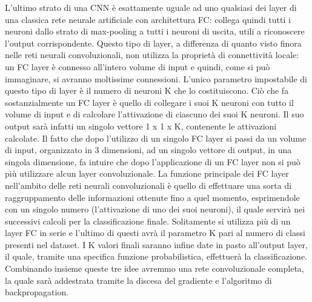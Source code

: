 \documentclass[twoside,twocolumn,10pt]{extarticle}
\theoremstyle{definition}
\begin{document}
L'ultimo strato di una CNN è esattamente uguale ad uno qualsiasi dei layer di una classica rete neurale artificiale con architettura FC: collega quindi tutti i neuroni dallo strato di max-pooling a tutti i neuroni di uscita, utili a riconoscere l'output corrispondente.
Questo tipo di layer, a differenza di quanto visto finora nelle reti neurali convoluzionali, non utilizza la proprietà di connettività locale: un FC layer è connesso all'intero volume di input e quindi, come si può immaginare, si avranno moltissime connessioni. L’unico parametro impostabile di questo tipo di layer è il numero di neuroni K che lo costituiscono. Ciò che fa sostanzialmente un FC layer è quello di collegare i suoi K neuroni con tutto il volume di input e di calcolare l’attivazione di ciascuno dei suoi K neuroni.
Il suo output sarà infatti un singolo vettore 1 x 1 x K, contenente le attivazioni calcolate. Il fatto che dopo l’utilizzo di un singolo FC layer si passi da un volume di input, organizzato in 3 dimensioni, ad un singolo vettore di output, in una singola dimensione, fa intuire che dopo l’applicazione di un FC layer non si può più utilizzare alcun layer convoluzionale. La funzione principale dei FC layer nell'ambito delle reti neurali convoluzionali è quello di effettuare una sorta di raggruppamento delle informazioni ottenute fino
a quel momento, esprimendole con un singolo numero (l’attivazione di uno dei suoi neuroni), il quale servirà nei successivi calcoli per la classificazione finale. Solitamente si utilizza più di un layer FC in serie e l’ultimo di questi avrà il parametro K pari al numero di classi presenti nel dataset. I K valori finali saranno infine date in pasto all'output layer, il quale, tramite una specifica funzione probabilistica, effettuerà la classificazione. Combinando insieme queste tre idee avremmo una rete convoluzionale completa, la quale sarà addestrata tramite la discesa del gradiente e l’algoritmo di backpropagation.
\end{document}

